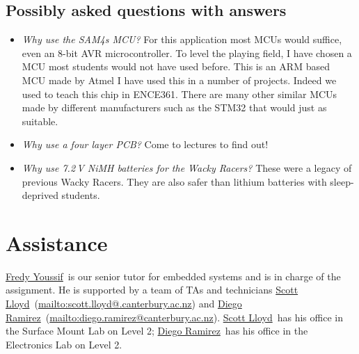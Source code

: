 \documentclass[11pt, a4paper]{article}
\makeatletter
\newcommand{\scottemail}{\url{mailto:scott.lloyd@.canterbury.ac.nz}}
\newcommand{\diegoemail}{\url{mailto:diego.ramirez@canterbury.ac.nz}}
\newcommand{\fredy}{\href{mailto:fredy.youssif@pg.canterbury.ac.nz}{Fredy Youssif}}
\newcommand{\scott}{\href{mailto:scott.lloyd@.canterbury.ac.nz}{Scott Lloyd}}
\newcommand{\diego}{\href{mailto:diego.ramirez@canterbury.ac.nz}{Diego Ramirez}}
\makeatother
\begin{document}
\subsection{Possibly asked questions with answers}

\begin{itemize}
\item \emph{Why use the SAM4s MCU?}  For this application most MCUs
  would suffice, even an 8-bit AVR microcontroller.  To level the
  playing field, I have chosen a MCU most students would not have used
  before.  This is an ARM based MCU made by Atmel I have used this in
  a number of projects.  Indeed we used to teach this chip in ENCE361.
  There are many other similar MCUs made by different manufacturers
  such as the STM32 that would just as suitable.

\item \emph{Why use a four layer PCB?}  Come to lectures to find out!

\item \emph{Why use 7.2\,V NiMH batteries for the Wacky Racers?}
  These were a legacy of previous Wacky Racers.  They are also safer
  than lithium batteries with sleep-deprived students.


\end{itemize}


\section{Assistance}

\fredy\ is our senior tutor for embedded systems and is in charge of
the assignment.  He is supported by a team of TAs and technicians
\scott\ (\scottemail) and \diego\ (\diegoemail).  \scott\ has his
office in the Surface Mount Lab on Level 2; \diego\ has his office in
the Electronics Lab on Level 2.
\end{document}
